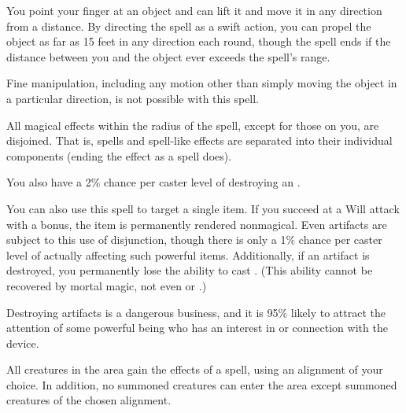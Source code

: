 \spelldur{\durshort}
\begin{spelleffect}
    You point your finger at an object and can lift it and move it in any direction from a distance. By directing the spell as a swift action, you can propel the object as far as 15 feet in any direction each round, though the spell ends if the distance between you and the object ever exceeds the spell's range.
\end{spelleffect}
\begin{spellnotes}
    Fine manipulation, including any motion other than simply moving the object in a particular direction, is not possible with this spell.
\end{spellnotes}

\begin{spelleffect}
    All magical effects within the radius of the spell, except for those on you, are disjoined. That is, spells and spell-like effects are separated into their individual components (ending the effect as a  spell does).
    \par You also have a 2\% chance per caster level of destroying an .
    \par You can also use this spell to target a single item. If you succeed at a Will attack with a  bonus, the item is permanently rendered nonmagical. Even artifacts are subject to this use of disjunction, though there is only a 1\% chance per caster level of actually affecting such powerful items. Additionally, if an artifact is destroyed, you permanently lose the ability to cast . (This ability cannot be recovered by mortal magic, not even  or .)
    \par {} Destroying artifacts is a dangerous business, and it is 95\% likely to attract the attention of some powerful being who has an interest in or connection with the device.
\end{spelleffect}

\spelldur{\durshort \dismissable}
\begin{spelleffect}
    All creatures in the area gain the effects of a  spell, using an alignment of your choice. In addition, no summoned creatures can enter the area except summoned creatures of the chosen alignment.
\end{spelleffect}

